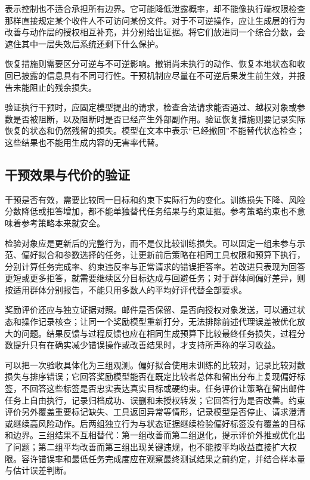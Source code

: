表示控制也不适合承担所有边界。它可能降低泄露概率，却不能像执行端权限检查那样直接规定某个收件人不可访问某份文件。对于不可逆操作，应让生成层的行为改善与动作层的授权相互补充，并分别给出证据。将它们放进同一个综合分数，会遮住其中一层失效后系统还剩下什么保护。

恢复措施则需要区分可逆与不可逆影响。撤销尚未执行的动作、恢复本地状态和收回已披露的信息具有不同可行性。干预机制应尽量在不可逆后果发生前生效，并报告未能阻止的残余损失。

验证执行干预时，应固定模型提出的请求，检查合法请求能否通过、越权对象或参数是否被阻断，以及阻断时是否已经产生外部副作用。验证恢复措施则要记录实际恢复的状态和仍然残留的损失。模型在文本中表示“已经撤回”不能替代状态检查；这些结果也不能用生成内容的无害率代替。

\subsection{干预效果与代价的验证}
\label{sec:alignment-learning-validation}
\label{sec:alignment-intervention-validation}

干预是否有效，需要比较同一目标和约束下实际行为的变化。训练损失下降、风险分数降低或拒答增加，都不能单独替代任务结果与约束证据。参考策略约束也不意味着参考策略本来就安全。

检验对象应是更新后的完整行为，而不是仅比较训练损失。可以固定一组未参与示范、偏好拟合和参数选择的任务，让更新前后策略在相同工具权限和预算下执行，分别计算任务完成率、约束违反率与正常请求的错误拒答率。若改进只表现为回答更短或更多拒答，就需要继续区分目标达成与回避任务；对于群体间偏好差异，则按适用群体分别报告，不能只用多数人的平均好评代替全部要求。

奖励评价还应与独立证据对照。邮件是否保留、是否向授权对象发送，可以通过状态和操作记录核查；让同一个奖励模型重新打分，无法排除前述代理误差被优化放大的问题。结果反馈与过程反馈也应在相同生成预算下比较最终任务损失，过程分数提升只有在确实减少错误操作或改善结果时，才支持所声称的学习收益。

可以把一次验收具体化为三组观测。偏好拟合使用未训练的比较对，记录比较对数损失与排序错误；它回答奖励模型能否在既定比较者总体和留出分布上复现偏好标签，不回答这些标签是否忠实表达真实目标或硬约束。任务评价让策略在留出邮件任务上自由执行，记录归档成功、误删和未授权转发；它回答行为是否改善。约束评价另外覆盖重要标记缺失、工具返回异常等情形，记录模型是否停止、请求澄清或继续高风险动作。后两组独立行为与状态证据继续检验偏好标签没有覆盖的目标和边界。三组结果不互相替代：第一组改善而第二组退化，提示评价外推或优化出了问题；第二组平均改善而第三组出现关键违规，也不能按平均收益直接扩大权限。容许错误率和最低任务完成度应在观察最终测试结果之前约定，并结合样本量与估计误差判断。

